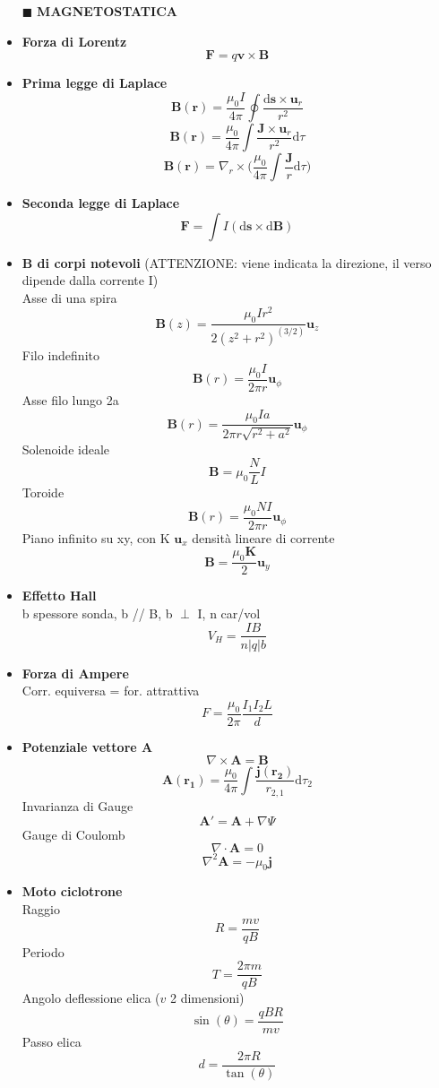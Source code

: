 \documentclass{book}
\newcommand{\g}{\textbf}
\newcommand{\h}{\mathbf}
\newcommand{\e}{\begin{equation}}
\newcommand{\ex}{\end{equation} }
\renewcommand{\it}{\item[$\cdot$]}
\begin{document}
\begin{multicols}{4}
\begin{itemize}
\hline
\item [$\blacksquare$] \g{MAGNETOSTATICA}
    \it \g{Forza di Lorentz}
        \e{\h{F}=q\h{v}\times\h{B}}\ex
    \it \g{Prima legge di Laplace}
        \e{\h{B}(\h{r})=\frac{\mu_0 I}{4\pi}\oint\frac{\mathrm{d}\h{s}\times\h{u}_r}{r^2}} \ex
        \e{\h{B}(\h{r})=\frac{\mu_0}{4\pi}\int\frac{\h{J}\times\h{u}_r}{r^2} \mathrm{d}\tau} \ex
        \e{\h{B}(\h{r})=\nabla_r\times\biggl(\frac{\mu_0}{4\pi}\int\frac{\h{J}}{r}\mathrm{d}\tau\biggr)} \ex
    \it \g{Seconda legge di Laplace}
        \e{\h{F}=\int I(\mathrm{d}\h{s}\times \mathrm{d}\h{B})} \ex
    \it \g{B di corpi notevoli} (ATTENZIONE: viene indicata la direzione, il verso dipende dalla corrente I) \\
    Asse di una spira
        \e{\h{B}(z)=\frac{\mu_0Ir^2}{2(z^2+r^2)^(3/2)}\h{u}_z} \ex
    Filo indefinito
        \e{\h{B}(r)=\frac{\mu_0I}{2\pi r}\h{u}_\phi} \ex
    Asse filo lungo 2a
        \e{\h{B}(r)=\frac{\mu_0Ia}{2\pi r \sqrt{r^2+a^2}}\h{u}_\phi} \ex
    Solenoide ideale
        \e{\h{B}=\mu_0\frac{N}{L}I}\ex
    Toroide
        \e{\h{B}(r)=\frac{\mu_0NI}{2\pi r}\h{u}_\phi} \ex
    Piano infinito su xy, con K $\h{u}_{x}$ densità lineare di corrente
        \e{\h{B}=\frac{\mu_0 \h{K}}{2}\h{u}_y} \ex
    \it \g{Effetto Hall} \\
    b spessore sonda, b // B, b $\perp$ I, n car/vol
        \e{V_H=\frac{IB}{n|q|b}} \ex
    \it \g{Forza di Ampere} \\
    Corr. equiversa = for. attrattiva 
        \e{F = \frac{\mu_0}{2\pi} \frac{I_1 I_2 L}{d}}\ex
    \it \g{Potenziale vettore A}
        \e{\nabla\times\h{A}=\h{B}}\ex
        \e{\h{A}(\h{r_1})=\frac{\mu_0}{4\pi}\int\frac{\h{j}(\h{r_2})}{r_{2,1}}\mathrm{d}\tau_2}\ex
    Invarianza di Gauge
        \e{\h{A'}=\h{A}+\nabla\Psi}\ex
    Gauge di Coulomb
        \e{\nabla\cdot \h{A}=0}\ex
        \e{\nabla^2\h{A}=-\mu_0\h{j}}\ex
    \it \g{Moto ciclotrone} \\
        Raggio
        \e{R = \frac{mv}{qB}}\ex 
        Periodo 
        \e{T = \frac{2\pi m}{qB}}\ex 
        Angolo deflessione elica ($v$ 2 dimensioni) 
        \e{\sin(\theta) = \frac{qBR}{mv}}\ex 
        Passo elica 
        \e{d=\frac{2\pi R}{\tan(\theta)}} \ex


\end{itemize}
\end{multicols}
\end{document}
